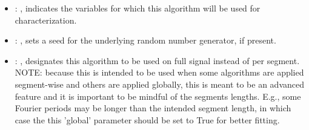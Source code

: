 \begin{itemize}
\begin{itemize}
          \item {}: , 
            indicates the variables for which this algorithm will be used for characterization.
          \item {}: , 
            sets a seed for the underlying random number generator, if present.
          \item {}: , 
            designates this algorithm to be used on full signal instead of per
            segment. NOTE: because this is intended to be used when some algorithms are
            applied segment-wise and others are applied globally, this is meant to be an
            advanced feature and it is important to be mindful of the segments lengths.
            E.g., some Fourier periods may be longer than the intended segment length, in
            which case the this 'global' parameter should be set to True for better
            fitting. 
      \end{itemize}


\end{itemize}
